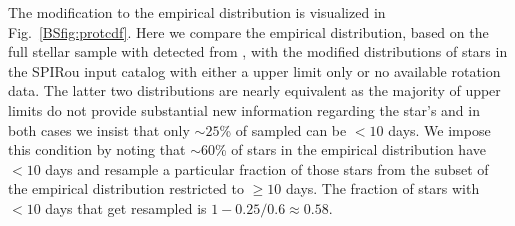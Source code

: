 The modification to the empirical \prot{} distribution is visualized in Fig.~\ref{BSfig:protcdf}.
Here we compare the empirical \prot{} distribution, based on the full stellar sample with detected
\prot{} from \cite{newton16a}, with the modified distributions of stars in the SPIRou input catalog
with either a \vsini{}
upper limit only or no available rotation data. The latter two distributions are nearly equivalent as
the majority of \vsini{} upper limits do not provide substantial new information regarding the star's \prot{}
and in both cases we insist that only $\sim 25$\% of sampled \prot{} can be $< 10$ days. We impose this
condition by noting that $\sim 60$\% of stars in the empirical distribution have \prot{} $<10$ days
and resample a particular fraction of those stars from the subset of the empirical distribution restricted
to \prot{} $\geq 10$ days. The fraction of stars with \prot{} $<10$ days that get resampled is
$1-0.25/0.6 \approx 0.58$.

